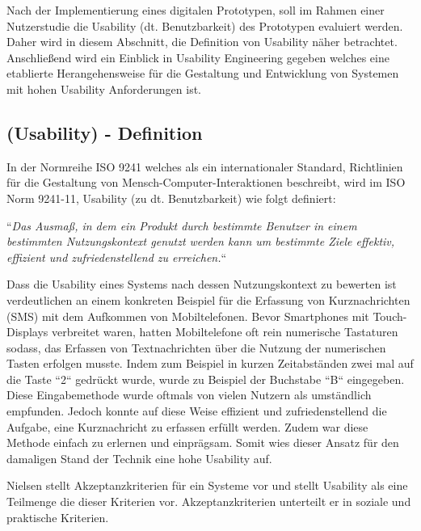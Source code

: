 Nach der Implementierung eines digitalen Prototypen, soll im Rahmen einer Nutzerstudie die Usability (dt. Benutzbarkeit) des Prototypen evaluiert werden.
Daher wird in diesem Abschnitt, die Definition von Usability näher betrachtet. Anschließend wird ein Einblick in Usability Engineering gegeben welches eine etablierte Herangehensweise für
die Gestaltung und Entwicklung von Systemen mit hohen Usability Anforderungen ist. 

\subsection{(Usability) - Definition} \label{UsaDef}

In der Normreihe ISO 9241 welches als ein internationaler Standard, Richtlinien für die Gestaltung von Mensch-Computer-Interaktionen beschreibt, wird im ISO Norm 9241-11,  Usability (zu dt. Benutzbarkeit) wie folgt definiert:

``\textit{Das Ausmaß, in dem ein Produkt durch bestimmte Benutzer in einem bestimmten Nutzungskontext genutzt werden kann um bestimmte Ziele effektiv, effizient und zufriedenstellend zu erreichen.}``

Dass die Usability eines Systems nach dessen Nutzungskontext zu bewerten ist verdeutlichen \cite{MichaelRichter2016} an einem konkreten Beispiel für die Erfassung 
von Kurznachrichten (SMS) mit dem Aufkommen von Mobiltelefonen. Bevor Smartphones mit Touch-Displays verbreitet waren, hatten Mobiltelefone oft rein numerische Tastaturen sodass, das Erfassen 
von Textnachrichten über die Nutzung der numerischen Tasten erfolgen musste. Indem zum Beispiel in kurzen Zeitabständen zwei mal auf die Taste ``2`` gedrückt wurde, wurde zu Beispiel der Buchstabe 
``B`` eingegeben. Diese Eingabemethode wurde oftmals von vielen Nutzern als umständlich empfunden. Jedoch konnte auf diese Weise effizient und zufriedenstellend die Aufgabe, eine Kurznachricht 
zu erfassen erfüllt werden. Zudem war diese Methode einfach zu erlernen und einprägsam. Somit wies dieser Ansatz für den damaligen Stand der Technik eine hohe Usability auf. 

Nielsen stellt \cite{Nielsen1994} Akzeptanzkriterien für ein Systeme vor und stellt Usability als eine Teilmenge die dieser Kriterien vor.
Akzeptanzkriterien unterteilt er in soziale und praktische Kriterien.

